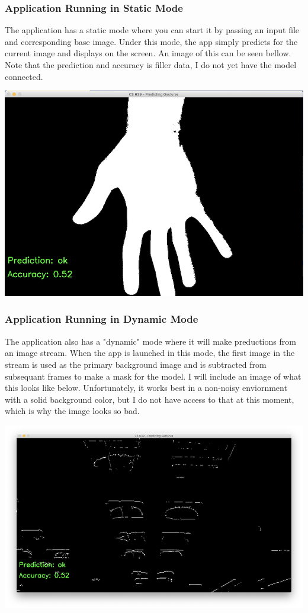 \documentclass[9pt]{article}
\begin{document}
\subsubsection{Application Running in Static Mode}
The application has a static mode where you can start it by passing an input file and corresponding base image. Under this mode, the app simply predicts for the current image and displays on the screen. An image of this can be seen bellow. Note that the prediction and accuracy is filler data, I do not yet have the model connected.

\includegraphics{app_static.png}

\subsubsection{Application Running in Dynamic Mode}
The application also has a "dynamic" mode where it will make preductions from an image stream. When the app is launched in this mode, the first image in the stream is used as the primary background image and is subtracted from subsequant frames to make a mask for the model. I will include an image of what this looks like below. Unfortunately, it works best in a non-noisy enviornment with a solid background color, but I do not have access to that at this moment, which is why the image looks so bad.

\includegraphics{app_dynamic.png}
\end{document}
